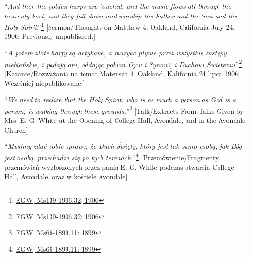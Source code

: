 “\textit{And then the golden harps are touched, and the music flows all through the heavenly host, and they fall down and worship the Father and the Son and the Holy Spirit}.”\footnote{\href{https://egwwritings.org/?ref=en_Ms139-1906.32&para=9579.38}{EGW; Ms139-1906.32; 1906}} [Sermon/Thoughts on Matthew 4. Oakland, California July 24, 1906; Previously unpublished.]


“\textit{A potem złote harfy są dotykane, a muzyka płynie przez wszystkie zastępy niebiańskie, i padają oni, oddając pokłon Ojcu i Synowi, i Duchowi Świętemu}.”\footnote{\href{https://egwwritings.org/?ref=en_Ms139-1906.32&para=9579.38}{EGW; Ms139-1906.32; 1906}} [Kazanie/Rozważania na temat Mateusza 4. Oakland, Kalifornia 24 lipca 1906; Wcześniej niepublikowane.]


“\textit{We need to realize that the Holy Spirit, who is as much a person as God is a person, is walking through these grounds.}”\footnote{\href{https://egwwritings.org/?ref=en_Ms66-1899.11&para=6622.19}{EGW; Ms66-1899.11: 1899}} [Talk/Extracts From Talks Given by Mrs. E. G. White at the Opening of College Hall, Avondale, and in the Avondale Church]


“\textit{Musimy zdać sobie sprawę, że Duch Święty, który jest tak samo osobą, jak Bóg jest osobą, przechadza się po tych terenach.}”\footnote{\href{https://egwwritings.org/?ref=en_Ms66-1899.11&para=6622.19}{EGW; Ms66-1899.11: 1899}} [Przemówienie/Fragmenty przemówień wygłoszonych przez panią E. G. White podczas otwarcia College Hall, Avondale, oraz w kościele Avondale]
